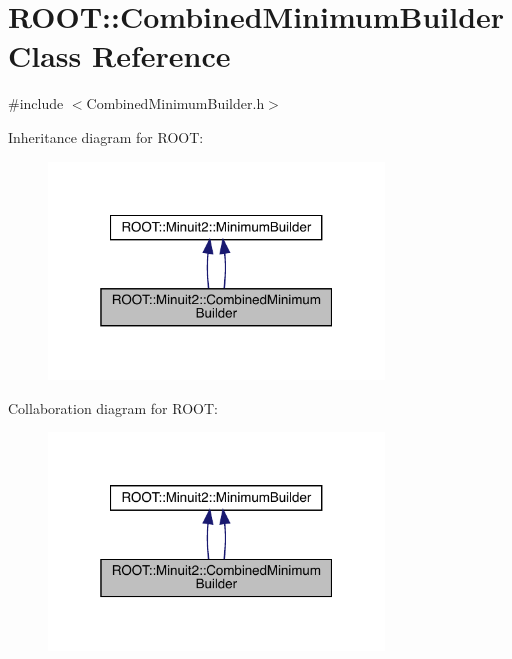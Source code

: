 \hypertarget{classROOT_1_1Minuit2_1_1CombinedMinimumBuilder}{}\section{R\+O\+OT\+:\+:Combined\+Minimum\+Builder Class Reference}
\label{classROOT_1_1Minuit2_1_1CombinedMinimumBuilder}


{\ttfamily \#include $<$Combined\+Minimum\+Builder.\+h$>$}



Inheritance diagram for R\+O\+OT\+:\nopagebreak
\begin{figure}[H]
\begin{center}
\leavevmode
\includegraphics[width=253pt]{db/d8f/classROOT_1_1Minuit2_1_1CombinedMinimumBuilder__inherit__graph}
\end{center}
\end{figure}


Collaboration diagram for R\+O\+OT\+:\nopagebreak
\begin{figure}[H]
\begin{center}
\leavevmode
\includegraphics[width=253pt]{d5/d5f/classROOT_1_1Minuit2_1_1CombinedMinimumBuilder__coll__graph}
\end{center}
\end{figure}
